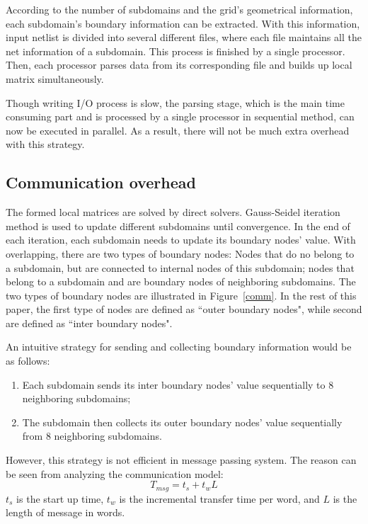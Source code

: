 \documentclass{sig-alternate}
\begin{document}
	According to the number of subdomains and the grid's geometrical information, each subdomain's boundary information can be 
	extracted. With this information, input netlist is divided into several different files, where each file maintains all the net 
	information of a subdomain. This process is finished by a single processor. Then, each processor parses data from its
	corresponding file and builds up local matrix simultaneously.

	Though writing I/O process is slow, the parsing stage, which is the main time consuming part and is 
	processed by a single processor in sequential method, can now be executed in parallel. As a result, 
	there will not be much extra overhead with this strategy.
     \subsection{Communication overhead}
	The formed local matrices are solved by direct solvers. Gauss-Seidel iteration method is used
	to update different subdomains until convergence. In the end of each iteration, each subdomain needs to update its 
	boundary nodes' value. With overlapping, there are two types of boundary nodes: Nodes that do no 
	belong to a subdomain, but are connected to internal nodes of 
	this subdomain; nodes that belong to a subdomain and are boundary nodes of neighboring subdomains. The 
	two types of boundary nodes are illustrated in Figure~\ref{comm}. In the rest of this paper, the first type of nodes are defined
	as ``outer boundary nodes", while second are defined as ``inter boundary nodes". 

	An intuitive strategy for sending and collecting boundary information would be as follows:

	\begin{enumerate}[1.]
	  \item Each subdomain sends its inter boundary nodes' value sequentially to 8 neighboring subdomains;
	  \item The subdomain then collects its outer boundary nodes' value sequentially from 8 neighboring subdomains.
	\end{enumerate}	

 	However, this strategy is not efficient in message passing system. The reason can be seen from analyzing the
	communication model:
	\begin{equation}
		T_{msg} = t_s + t_wL\label{eq_msg}
	\end{equation}
	$t_s$ is the start up time, $t_w$ is the incremental transfer time per word, and $L$ is the length of message in words.
	
\end{document}
